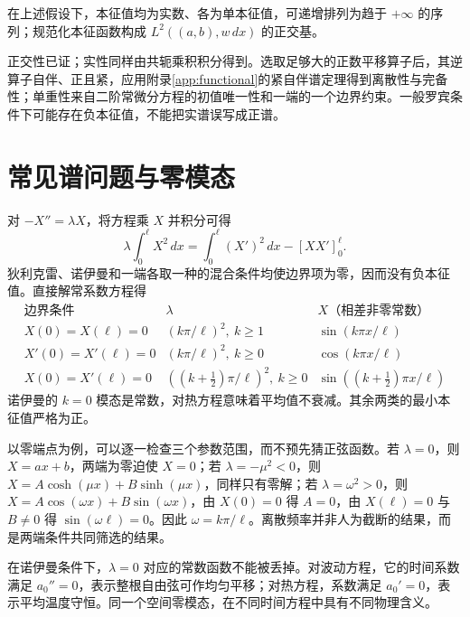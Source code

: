 \documentclass[UTF8,12pt,a4paper,fontset=fandol]{ctexbook}
\begin{document}
\begin{theorem}[正则谱结论]
在上述假设下，本征值均为实数、各为单本征值，可递增排列为趋于 $+\infty$ 的序列；规范化本征函数构成 $L^2((a,b),w\,dx)$ 的正交基。
\end{theorem}
正交性已证；实性同样由共轭乘积积分得到。选取足够大的正数平移算子后，其逆算子自伴、正且紧，应用附录\ref{app:functional}的紧自伴谱定理得到离散性与完备性；单重性来自二阶常微分方程的初值唯一性和一端的一个边界约束。一般罗宾条件下可能存在负本征值，不能把实谱误写成正谱。

\section{常见谱问题与零模态}
对 $-X''=\lambda X$，将方程乘 $X$ 并积分可得
\[
 \lambda\int_0^\ell X^2\,dx=\int_0^\ell(X')^2\,dx-[XX']_0^\ell.
\]
狄利克雷、诺伊曼和一端各取一种的混合条件均使边界项为零，因而没有负本征值。直接解常系数方程得
\[
\begin{array}{c|c|c}
 \text{边界条件}&\lambda&X\text{（相差非零常数）}\\\hline
 X(0)=X(\ell)=0&(k\pi/\ell)^2,\ k\ge1&\sin(k\pi x/\ell)\\
 X'(0)=X'(\ell)=0&(k\pi/\ell)^2,\ k\ge0&\cos(k\pi x/\ell)\\
 X(0)=X'(\ell)=0&((k+\tfrac12)\pi/\ell)^2,\ k\ge0&\sin((k+\tfrac12)\pi x/\ell)
\end{array}
\]
诺伊曼的 $k=0$ 模态是常数，对热方程意味着平均值不衰减。其余两类的最小本征值严格为正。

以零端点为例，可以逐一检查三个参数范围，而不预先猜正弦函数。若 $\lambda=0$，则 $X=ax+b$，两端为零迫使 $X=0$；若 $\lambda=-\mu^2<0$，则 $X=A\cosh(\mu x)+B\sinh(\mu x)$，同样只有零解；若 $\lambda=\omega^2>0$，则 $X=A\cos(\omega x)+B\sin(\omega x)$，由 $X(0)=0$ 得 $A=0$，由 $X(\ell)=0$ 与 $B\ne0$ 得 $\sin(\omega\ell)=0$。因此 $\omega=k\pi/\ell$。离散频率并非人为截断的结果，而是两端条件共同筛选的结果。

在诺伊曼条件下，$\lambda=0$ 对应的常数函数不能被丢掉。对波动方程，它的时间系数满足 $a_0''=0$，表示整根自由弦可作均匀平移；对热方程，系数满足 $a_0'=0$，表示平均温度守恒。同一个空间零模态，在不同时间方程中具有不同物理含义。
\end{document}
